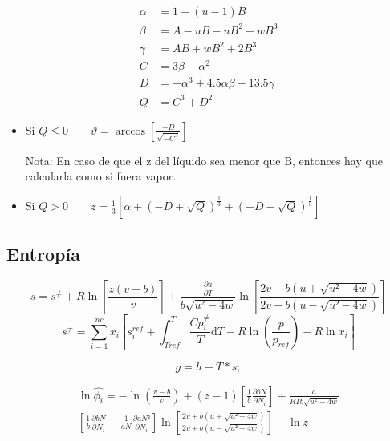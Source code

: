 \begin{align}
\alpha &= 1-(u-1)B\\
\beta &= A -uB-uB^2+wB^3\\
\gamma &= AB +wB^2+ 2B^3\\
C &= 3\beta - \alpha^2\\
D&= - \alpha^3+ 4.5 \alpha \beta -13.5 \gamma\\
Q&=C^3+D^2
\end{align}


\begin{itemize}
\item Si $Q \leq 0 \qquad \vartheta = \arccos \left[\frac{-D}{\sqrt{-C^3}}\right]$
Nota: En caso de que el z del líquido sea menor que B, entonces hay que calcularla como si fuera vapor.
\item Si $Q > 0 \qquad z = \frac{1}{3}\left[\alpha + \left(-D + \sqrt{Q}\right)^{\frac{1}{3}}+ \left(-D - \sqrt{Q}\right)^{\frac{1}{3}} \right]$
\end{itemize}

\subsection{Entropía}
\begin{equation}\label{eq:entropy}
s = s^{\neq} + R\ln\left[\frac{z(v-b)}{v}\right] + \frac{\frac{\partial a}{\partial T}}{b \sqrt{u^2 - 4w}}
\ln\left[\frac{2v+b\left(u + \sqrt{u²-4w}\right)}{2v+b\left(u - \sqrt{u²-4w}\right)}\right]
\end{equation}
\begin{equation}\label{eq:idealgasentropy}
s^{\neq} = \sum_{i=1}^{nc} x_i\left[s_i^{ref} + \int_{Tref}^T \frac{Cp_i^{\neq}}{T} \mathrm{d}T 
- R\ln \left(\frac{p}{p_{ref}}\right)- R\ln{x_i}
\right]
\end{equation}


\begin{equation}\label{eq:gibbs}
g = h - T * s;
\end{equation}


\begin{multline}\label{eq:fugacity}
\ln\hat{\phi_i} = - \ln\left(\frac{v-b}{v}\right) 
+ (z-1)\left[\frac{1}{b}\frac{\partial bN}{\partial N_i}\right]
+ \frac{a}{RTb\sqrt{u^2-4w}}
\\
\left[\frac{1}{b}\frac{\partial bN}{\partial N_i}
- \frac{1}{aN}\frac{\partial aN²}{\partial N_i}\right]
\ln\left[\frac{2v+b\left(u + \sqrt{u²-4w}\right)}{2v+b\left(u - \sqrt{u²-4w}\right)}\right]
-\ln{z}
\end{multline}




